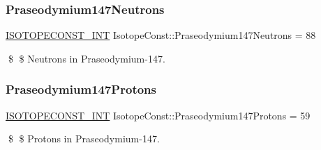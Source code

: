 \subsubsection{\texorpdfstring{Praseodymium147\+Neutrons}{Praseodymium147Neutrons}}
{\footnotesize\ttfamily \mbox{\hyperlink{group___isotope_const-_macros_ga5f18360b3e99483a35c32d789e62621c}{I\+S\+O\+T\+O\+P\+E\+C\+O\+N\+S\+T\+\_\+\+I\+NT}} Isotope\+Const\+::\+Praseodymium147\+Neutrons = 88}

\$ \$ Neutrons in Praseodymium-\/147. \mbox{\label{group___isotope_const-_praseodymium-_pr147_gae29c4e86b5b890a5754cdd28f0c3d6a0}} 
\subsubsection{\texorpdfstring{Praseodymium147\+Protons}{Praseodymium147Protons}}
{\footnotesize\ttfamily \mbox{\hyperlink{group___isotope_const-_macros_ga5f18360b3e99483a35c32d789e62621c}{I\+S\+O\+T\+O\+P\+E\+C\+O\+N\+S\+T\+\_\+\+I\+NT}} Isotope\+Const\+::\+Praseodymium147\+Protons = 59}

\$ \$ Protons in Praseodymium-\/147. 